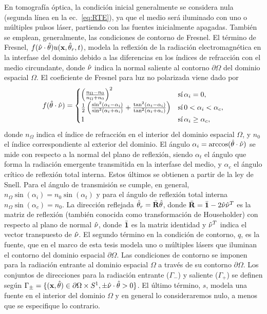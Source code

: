 En tomografía óptica, la condición inicial generalmente se considera nula 
(segunda línea en la ec.~\eqref{eq:RTE}), ya 
que el medio será iluminado con uno o múltiples pulsos láser, partiendo con las 
fuentes inicialmente apagadas. 
También se emplean, generalmente, las condiciones de contorno de Fresnel. 
El término de Fresnel, $f(\hat{\nu} \cdot \hat{\theta}) u(\mathbf{x},\hat{\theta}_r,t)$, 
modela la reflexión de la radiación electromagnética 
en la interfase del dominio  debido a las diferencias en los índices de refracción 
con el medio circundante, 
donde $\hat{\nu}$ indica la normal saliente al contorno $\partial \Omega$ del dominio espacial 
$\Omega$. 
El coeficiente de Fresnel para luz no polarizada viene dado por~\cite{Born1999}
\begin{equation}
f(\hat{\theta} \cdot \hat{\nu}) =
     \begin{cases}
      \left( \frac{n_{\Omega}-n_0}{n_{\Omega}+n_0} \right)^2  & \text{sí} \, \alpha_i = 0, \\
       \frac{1}{2}\left(\frac{\sin^2(\alpha_t-\alpha_i)}{\sin^2(\alpha_t+
       \alpha_i)}+\frac{\tan^2(\alpha_t-\alpha_i)}{\tan^2(\alpha_t+\alpha_i)}\right) & 
       \text{sí} \, 0<\alpha_i < \alpha_c, \\
      1  & \text{sí} \, \alpha_i \ge \alpha_c, \\
     \end{cases}
\end{equation}
donde $n_\Omega$ indica  el índice de refracción en el interior 
del dominio espacial $\Omega$, y $n_0$ el índice correspondiente al exterior del dominio. El ángulo $\alpha_i=\arccos(\hat{\theta} \cdot \hat{\nu})$ 
se mide con respecto a la normal del plano de reflexión, siendo $\alpha_t$ 
el ángulo que forma la radiación emergente transmitida en la interfase del medio, y $\alpha_c$ el ángulo 
crítico de reflexión total interna. Estos últimos se obtienen a partir de la ley de Snell. 
Para el ángulo de transmisión se cumple, en general, $n_{\Omega} \sin(\alpha_i)=n_0 \sin (\alpha_t)$ y para el  
ángulo de reflexión total interna $n_{\Omega} \sin(\alpha_c)=n_0$.
La dirección reflejada $\hat{\theta}_r=\bar{\mathbf{R}} \hat{\theta}$, donde $\bar{\mathbf{R}} =\bar{\mathbf{1}}-2\hat{\nu} \hat{\nu}^T$ es la matriz de reflexión 
(también conocida como transformación de Householder) con respecto al plano de normal $\hat{\nu}$, donde $\bar{\mathbf{1}}$ 
es la matriz identidad y $\hat{\nu}^T$ 
indica el vector transpuesto de $\hat{\nu}$.   El 
segundo término en la condición de contorno, $q$, es la fuente, que en el marco de esta tesis 
modela uno o múltiples lásers que iluminan el contorno del dominio espacial $\partial \Omega$. 
Las condiciones de contorno se imponen para la radiación entrante 
al dominio espacial $\Omega$ a través de su contorno $\partial \Omega$. 
Los conjuntos de direcciones para la radiación entrante ($\Gamma_-$) y saliente ($\Gamma_+$) 
se definen según $\Gamma_{\pm}=\{(\mathbf{x},\hat{\theta}) \in \partial \Omega \times S^1, 
\pm \hat \nu \cdot \hat{\theta} >0 \}$. 
El último término, $s$, modela una fuente en el interior 
del dominio $\Omega$ y en general lo consideraremos nulo, a menos 
que se especifique lo contrario. 

